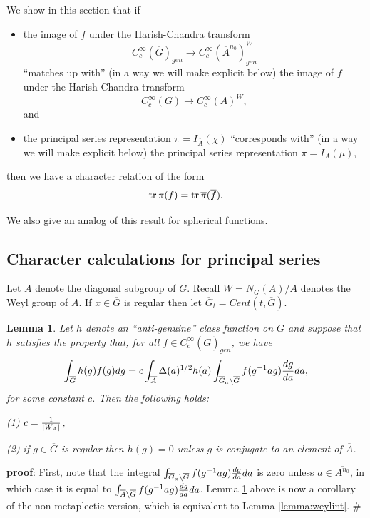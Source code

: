 \documentclass[twocolumn,10pt]{article}
\newtheorem{lemma}[theorem]{Lemma}
\begin{document}
We show in this section that if

\begin{itemize}
\item
the image of $\overline{f}$ under
the Harish-Chandra transform
\[
C_c^\infty(\overline{G})_{gen}
\rightarrow 
C_c^\infty(\overline{A}^{n_0})^W_{gen}
\]
``matches up with'' (in a way we will make explicit below)
the image of $f$ under the Harish-Chandra transform
\[
C_c^\infty(G) \rightarrow C_c^\infty(A)^W,
\]
and 

\item 
the principal series representation 
$\overline{\pi}=I_{\overline{A}}(\chi)$
``corresponds with'' (in a way we will make explicit below)
 the principal series representation $\pi=I_{A}(\mu)$,
\end{itemize}
then we have a character relation of the form
\[
{\rm tr}\,\pi(f)={\rm tr}\,\overline{\pi}(\overline{f}).
\]

We also give an analog of this result for spherical functions.

\subsection{Character calculations for principal series}

Let $A$ denote the diagonal subgroup of $G$.
Recall $W=N_{G}(A)/A$ denotes the Weyl group of $A$. 
If $x\in \overline{G}$ is regular then let
$\overline{G}_t=Cent(t,\overline{G})$.

\begin{lemma}
Let $h$ denote an ``anti-genuine'' class function on $\overline{G}$
and suppose that $h$ satisfies the property that, for all
$f\in C_c^\infty(\overline{G})_{gen}$, we have
\[
\int_{\overline{G}}
h(g)f(g)dg=
c\int_{\overline{A}}\Delta(a)^{1/2}h(a)
\int_{\overline{G}_a\backslash \overline{G}}
f(g^{-1}ag){dg\over da}da,
\]
for some constant $c$. Then the following holds:

(1) $c={1\over |W_A|}$,

(2) if $g\in \overline{G}$ is regular then
$h(g)=0$ unless $g$ is conjugate to an element of 
$\overline{A}$.
\label{lemma:Weyl}
\end{lemma}

{\bf proof}: First, note that the integral
$\int_{\overline{G}_a\backslash \overline{G}}
f(g^{-1}ag){dg\over da}da$ is zero unless
$a\in \overline{A^{n_0}}$, in which case
it is equal to $\int_{\overline{A}\backslash \overline{G}}
f(g^{-1}ag){dg\over da}da$. Lemma \ref{lemma:Weyl}
above is now a corollary of the non-metaplectic version, 
which is equivalent to Lemma
\ref{lemma:weylint}. $\#$
\end{document}
